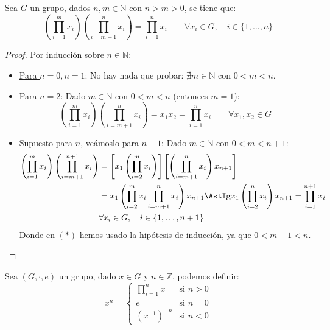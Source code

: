 \begin{prop}
    Sea $G$ un grupo, dados $n,m\in \mathbb{N}$ con $n>m>0$, se tiene que:
    \begin{equation*}
        \left(\prod_{i=1}^m x_i\right) \left(\prod_{i=m+1}^nx_i\right) = \prod_{i=1}^n x_i \qquad \forall x_i \in G, \quad i \in \{1,\ldots,n\}
    \end{equation*}
    \begin{proof}
        Por inducción sobre $n\in \mathbb{N}$:
        \begin{itemize}
            \item \underline{Para $n=0,n=1$}: No hay nada que probar: $\nexists m\in \mathbb{N}$ con $0<m<n$.
            \item \underline{Para $n=2$}: Dado $m\in \mathbb{N}$ con $0<m<n$ (entonces $m=1$):
            \begin{equation*}
                \left(\prod_{i=1}^m x_i\right) \left(\prod_{i=m+1}^nx_i\right) = x_1 x_2 =\prod_{i=1}^n x_i \qquad \forall x_1,x_2\in G
            \end{equation*}
            \item \underline{Supuesto para $n$}, veámoslo para $n+1$: Dado $m\in \mathbb{N}$ con $0<m<n+1$:
            \begin{align*}
                \left(\prod_{i=1}^m x_i\right) \left(\prod_{i=m+1}^{n+1}x_i\right) &= \left[x_1\left(\prod_{i=2}^m x_i\right)\right]\left[\left(\prod_{i=m+1}^nx_i\right) x_{n+1}\right]\\  
                                                                                   &= x_1\left(\prod_{i=2}^m x_i \prod_{i=m+1}^nx_i\right)x_{n+1} \AstIg x_1 \left(\prod_{i=2}^n x_i\right) x_{n+1} = \prod_{i=1}^{n+1} x_i \\
                                                                                   &\forall x_i \in G, \quad i \in \{1,\ldots,n+1\}
            \end{align*}
            Donde en $(\ast)$ hemos usado la hipótesis de inducción, ya que $0<m-1<n$.
        \end{itemize}
    \end{proof}
\end{prop}

\begin{definicion}[Potencia]
    Sea $(G,\cdot,e)$ un grupo, dado $x\in G$ y $n\in \mathbb{Z}$, podemos definir:
    \begin{equation*}
        x^n = \left\{\begin{array}{cr}
                \prod\limits_{i=1}^n x & \text{si\ }n > 0 \\
                e & \text{si\ }n = 0 \\
                {(x^{-1})}^{-n} & \text{si\ }n < 0
        \end{array}\right.
    \end{equation*}
\end{definicion}

